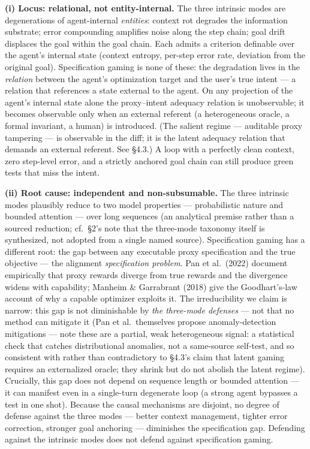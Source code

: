 \documentclass[
  11pt,
]{article}
\begin{document}
\textbf{(i) Locus: relational, not entity-internal.} The three intrinsic
modes are degenerations of agent-internal \emph{entities}: context rot
degrades the information substrate; error compounding amplifies noise
along the step chain; goal drift displaces the goal within the goal
chain. Each admits a criterion definable over the agent's internal state
(context entropy, per-step error rate, deviation from the original
goal). Specification gaming is none of these: the degradation lives in
the \emph{relation} between the agent's optimization target and the
user's true intent --- a relation that references a state external to
the agent. On any projection of the agent's internal state alone the
proxy--intent adequacy relation is unobservable; it becomes observable
only when an external referent (a heterogeneous oracle, a formal
invariant, a human) is introduced. (The salient regime --- auditable
proxy tampering --- is observable in the diff; it is the latent adequacy
relation that demands an external referent. See §4.3.) A loop with a
perfectly clean context, zero step-level error, and a strictly anchored
goal chain can still produce green tests that miss the intent.

\textbf{(ii) Root cause: independent and non-subsumable.} The three
intrinsic modes plausibly reduce to two model properties ---
probabilistic nature and bounded attention --- over long sequences (an
analytical premise rather than a sourced reduction; cf.~§2's note that
the three-mode taxonomy itself is synthesized, not adopted from a single
named source). Specification gaming has a different root: the gap
between any executable proxy specification and the true objective ---
the alignment \emph{specification problem}. Pan et al.~(2022) document
empirically that proxy rewards diverge from true rewards and the
divergence widens with capability; Manheim \& Garrabrant (2018) give the
Goodhart's-law account of why a capable optimizer exploits it. The
irreducibility we claim is narrow: this gap is not diminishable by
\emph{the three-mode defenses} --- not that no method can mitigate it
(Pan et al.~themselves propose anomaly-detection mitigations --- note
these are a partial, weak heterogeneous signal: a statistical check that
catches distributional anomalies, not a same-source self-test, and so
consistent with rather than contradictory to §4.3's claim that latent
gaming requires an externalized oracle; they shrink but do not abolish
the latent regime). Crucially, this gap does not depend on sequence
length or bounded attention --- it can manifest even in a single-turn
degenerate loop (a strong agent bypasses a test in one shot). Because
the causal mechanisms are disjoint, no degree of defense against the
three modes --- better context management, tighter error correction,
stronger goal anchoring --- diminishes the specification gap. Defending
against the intrinsic modes does not defend against specification
gaming.
\end{document}
